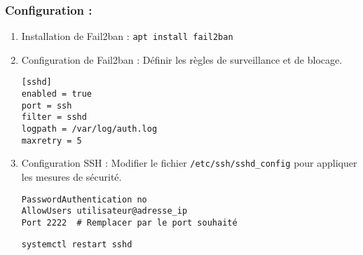 \subsubsection*{Configuration :}

\begin{enumerate}
	\item Installation de Fail2ban : \texttt{apt install fail2ban}
	\item Configuration de Fail2ban : Définir les règles de surveillance et de blocage.
	\begin{lstlisting}
[sshd]
enabled = true
port = ssh
filter = sshd
logpath = /var/log/auth.log
maxretry = 5
	\end{lstlisting}
	\item Configuration SSH : Modifier le fichier \texttt{/etc/ssh/sshd\_config} pour appliquer les mesures de sécurité.
	\begin{lstlisting}[style=tf]
PasswordAuthentication no
AllowUsers utilisateur@adresse_ip
Port 2222  # Remplacer par le port souhaité
	\end{lstlisting}
	\begin{lstlisting}
systemctl restart sshd
	\end{lstlisting}
\end{enumerate}